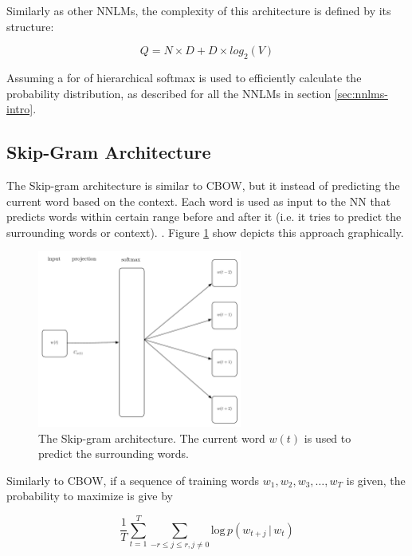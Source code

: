 Similarly as other \ac{NNLM}s, the complexity of this architecture
is defined by its structure:

\begin{equation}
  Q = N \times D + D \times  log_2(V)
\end{equation}

Assuming a for of hierarchical softmax is used to efficiently calculate the
probability distribution, as described for all the \ac{NNLM}s in section \ref{sec:nnlms-intro}.


\subsection{Skip-Gram Architecture}
\label{sec:skip-gram-architecture}

The Skip-gram architecture is similar to \ac{CBOW}, but it instead of
predicting the current word based on the context. Each  word is used as input
to the \ac{NN} that  predicts words within certain range before and after 
it (i.e. it tries to predict the surrounding words or context). 
\cite{DBLP:journals/corr/abs-1301-3781}. Figure
\ref{fig:skipgram-architecture-alone} show depicts this approach graphically.


\begin{figure}[hptb!]
    \centering
    \includegraphics[width=0.6\textwidth]{images/word2vec-skipgram-latex.pdf} 
    \caption{The Skip-gram architecture. The current word $w(t)$ is used to
      predict the  surrounding words.}
    \label{fig:skipgram-architecture-alone}
\end{figure}



Similarly to  \ac{CBOW}, if a sequence of training words $w_1,w_2,w_3,
\dots, w_T$ is given, the probability to maximize is give by

 \begin{equation}
  \label{eq:sumprob-cbow}
   \frac{1}{T} \sum^{T}_{t=1}{\sum_{-r \leq j \leq r, j \neq 0}\text{log} \, p
     \left( w_{t+j} \, |\, w_t  \right)}
\end{equation}

